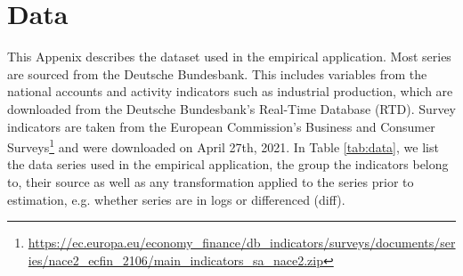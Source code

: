 \documentclass[notitlepage,a4paper,12pt]{article}
\begin{document}
\pagebreak

\section{Data}
\label{app:data}
This Appenix describes the dataset used in the empirical application. Most series are sourced from the Deutsche Bundesbank. This includes variables from the national accounts and activity indicators such as industrial production, which are downloaded from the Deutsche Bundesbank's Real-Time Database (RTD). Survey indicators are taken from the European Commission's Business and Consumer Surveys\footnote{\url{https://ec.europa.eu/economy_finance/db_indicators/surveys/documents/series/nace2_ecfin_2106/main_indicators_sa_nace2.zip}} and were downloaded on April 27th, 2021. In Table \ref{tab:data}, we list the data series used in the empirical application, the group the indicators belong to, their source as well as any transformation applied to the series prior to estimation, e.g. whether series are in logs or differenced (diff). 
\end{document}
